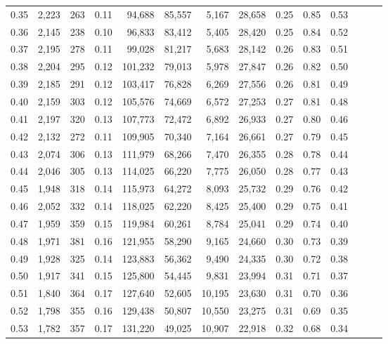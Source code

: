 \begin{tabular}{rrrrrrrrrrrrrr}
0.35 &  2,223 &    263 &  0.11 &   94,688 &   85,557 &   5,167 &  28,658 &  0.25 &  0.85 &      0.53 \\
0.36 &  2,145 &    238 &  0.10 &   96,833 &   83,412 &   5,405 &  28,420 &  0.25 &  0.84 &      0.52 \\
0.37 &  2,195 &    278 &  0.11 &   99,028 &   81,217 &   5,683 &  28,142 &  0.26 &  0.83 &      0.51 \\
0.38 &  2,204 &    295 &  0.12 &  101,232 &   79,013 &   5,978 &  27,847 &  0.26 &  0.82 &      0.50 \\
0.39 &  2,185 &    291 &  0.12 &  103,417 &   76,828 &   6,269 &  27,556 &  0.26 &  0.81 &      0.49 \\
0.40 &  2,159 &    303 &  0.12 &  105,576 &   74,669 &   6,572 &  27,253 &  0.27 &  0.81 &      0.48 \\
0.41 &  2,197 &    320 &  0.13 &  107,773 &   72,472 &   6,892 &  26,933 &  0.27 &  0.80 &      0.46 \\
0.42 &  2,132 &    272 &  0.11 &  109,905 &   70,340 &   7,164 &  26,661 &  0.27 &  0.79 &      0.45 \\
0.43 &  2,074 &    306 &  0.13 &  111,979 &   68,266 &   7,470 &  26,355 &  0.28 &  0.78 &      0.44 \\
0.44 &  2,046 &    305 &  0.13 &  114,025 &   66,220 &   7,775 &  26,050 &  0.28 &  0.77 &      0.43 \\
0.45 &  1,948 &    318 &  0.14 &  115,973 &   64,272 &   8,093 &  25,732 &  0.29 &  0.76 &      0.42 \\
0.46 &  2,052 &    332 &  0.14 &  118,025 &   62,220 &   8,425 &  25,400 &  0.29 &  0.75 &      0.41 \\
0.47 &  1,959 &    359 &  0.15 &  119,984 &   60,261 &   8,784 &  25,041 &  0.29 &  0.74 &      0.40 \\
0.48 &  1,971 &    381 &  0.16 &  121,955 &   58,290 &   9,165 &  24,660 &  0.30 &  0.73 &      0.39 \\
0.49 &  1,928 &    325 &  0.14 &  123,883 &   56,362 &   9,490 &  24,335 &  0.30 &  0.72 &      0.38 \\
0.50 &  1,917 &    341 &  0.15 &  125,800 &   54,445 &   9,831 &  23,994 &  0.31 &  0.71 &      0.37 \\
0.51 &  1,840 &    364 &  0.17 &  127,640 &   52,605 &  10,195 &  23,630 &  0.31 &  0.70 &      0.36 \\
0.52 &  1,798 &    355 &  0.16 &  129,438 &   50,807 &  10,550 &  23,275 &  0.31 &  0.69 &      0.35 \\
0.53 &  1,782 &    357 &  0.17 &  131,220 &   49,025 &  10,907 &  22,918 &  0.32 &  0.68 &      0.34 \\

\end{tabular}
